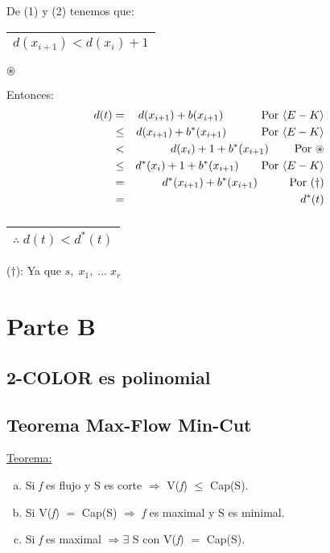 \documentclass[12pt,a4paper]{report}
\begin{document}
\begin{enumerate}
\begin{enumerate}[a)]
				\vspace{5mm}
				De (1) y (2) tenemos que: \begin{tabular}{|c|} \hline $d(x_{i+1}) < d(x_{i}) +1 $ \\ \hline \end{tabular} $\circledast$
			
				Entonces:
				\begin{eqnarray}
				\nonumber d(t) & = & d(x_{i+1}) + b(x_{i+1}) \qquad\;\;\;\;\;\textup{Por }\langle E-K \rangle\\
				\nonumber & \leq & d(x_{i+1}) + b^{*}(x_{i+1}) \qquad\;\;\;\;\textup{Por }\langle E-K \rangle\\
				\nonumber & < & d(x_{i}) +1 + b^{*}(x_{i+1}) \qquad\;\textup{Por } \circledast \\
				\nonumber & \leq & d^{*}(x_{i}) + 1 + b^{*}(x_{i+1}) \qquad\textup{Por }\langle E-K \rangle \\
				\nonumber & = & d^{*}(x_{i+1}) + b^{*}(x_{i+1}) \qquad\;\;\;\textup{Por } (\dag) \\
				\nonumber & = & d^{*}(t)
				\end{eqnarray}
				$\qquad\qquad\qquad\;\;\;$
				\begin{tabular}{|c|} \hline $\therefore \; d(t) < d^{*}(t)$ \\ \hline \end{tabular}

				($\dag$): Ya que $s, \; x_{1}, \; \dotsc \; x_{r}$
			\end{enumerate}
		\end{enumerate}
	
	
	






\chapter{Parte B}

	\section{2-COLOR es polinomial}
	
	
	\section{Teorema Max-Flow Min-Cut}
		\underline{Teorema:}
		\begin{enumerate}[a)]
			\item Si \textit{f} es flujo y S es corte $\Rightarrow$ V(\textit{f}) $\leq$ Cap(S).
			\item Si V(\textit{f}) $=$ Cap(S) $\Rightarrow$ \textit{f} es maximal y S es minimal.
			\item Si \textit{f} es maximal $\Rightarrow \exists$ S con V(\textit{f}) $=$ Cap(S).
		\end{enumerate}
		
\end{document}
